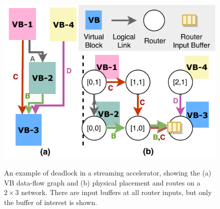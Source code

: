 \begin{figure}
\centering
\includegraphics[width=0.7\columnwidth]{figs/deadlock.pdf}
  \caption{An example of deadlock in a streaming accelerator, showing the (a) VB data-flow graph and (b) physical placement and routes on a $2\times3$ network. There are input buffers at all router inputs, but only the buffer of interest is shown.}\small\textsuperscript{}\label{fig:deadlock}
\end{figure}



